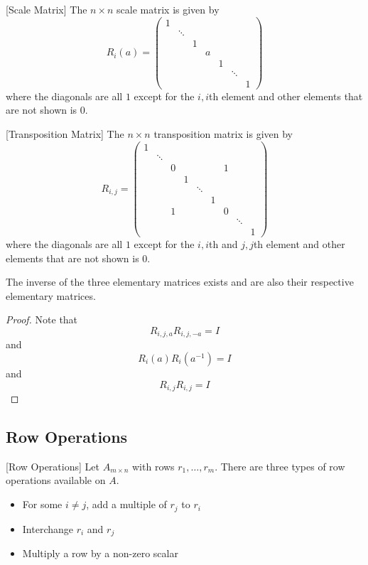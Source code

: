 \begin{defn}{}{}[Scale Matrix] The $n\times n$ scale matrix is given by $$R_{i}(a)=
\begin{pmatrix}
1&&&&&&\\
&\ddots&&&&&\\
&&1&&&&\\
&&&a&&&\\
&&&&1&&\\
&&&&&\ddots&\\
&&&&&&1
\end{pmatrix}$$ where the diagonals are all $1$ except for the $i,i$th element and other elements that are not shown is $0$.
\end{defn}

\begin{defn}{}{}[Transposition Matrix] The $n\times n$ transposition matrix is given by $$R_{i,j}=
\begin{pmatrix}
1&&&&&&&&\\
&\ddots&&&&&&&\\
&&0&&&&1&&\\
&&&1&&&&&\\
&&&&\ddots&&&&\\
&&&&&1&&&\\
&&1&&&&0&&\\
&&&&&&&\ddots&\\
&&&&&&&&1
\end{pmatrix}$$ where the diagonals are all $1$ except for the $i,i$th and $j,j$th element and other elements that are not shown is $0$.
\end{defn}

\begin{thm}{}{} The inverse of the three elementary matrices exists and are also their respective elementary matrices. 
\end{thm}
\begin{proof} Note that $$R_{i,j,a}R_{i,j,-a}=I$$ and $$R_i(a)R_i(a^{-1})=I$$ and $$R_{i,j}R_{i,j}=I$$
\end{proof}

\subsection{Row Operations}
\begin{defn}{}{}[Row Operations] Let $A_{m\times n}$ with rows $r_1,\dots,r_m$. There are three types of row operations available on $A$. 
\begin{itemize}
\item For some $i\neq j$, add a multiple of $r_j$ to $r_i$
\item Interchange $r_i$ and $r_j$
\item Multiply a row by a non-zero scalar
\end{itemize}
\end{defn}

